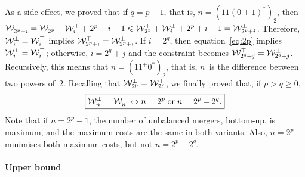 As a side-effect, we proved that if \(q=p-1\), that is,
\(n=(11(0+1)^*)_2\), then \(\mathcal{W}_{2^p+i}^{\top} = \mathcal{W}_{2^p}^{\top} +
\mathcal{W}_{i}^{\top} + 2^p + i - 1 \leqslant \mathcal{W}_{2^p}^{\top} + \mathcal{W}_{i}^{\bot} + 2^p
+ i - 1 = \mathcal{W}_{2^p+i}^{\bot}\). Therefore, \(\mathcal{W}_{i}^{\bot} = \mathcal{W}_{i}^{\top}\)
implies \(\mathcal{W}_{2^p+i}^{\top} = \mathcal{W}_{2^p+i}^{\bot}\). If \(i=2^q\), then
equation~\eqref{eq:2p} implies \(\mathcal{W}_{i}^{\bot} = \mathcal{W}_{i}^{\top}\);
otherwise, \(i = 2^q + j\) and the constraint becomes
\(\mathcal{W}_{2^q+j}^{\top} = \mathcal{W}_{2^q+j}^{\bot}\). Recursively, this means that
\(n=(11^+0^*)_2\), that is, \(n\)~is the difference between two powers
of~\(2\). Recalling that \(\mathcal{W}_{2^p}^{\bot} = \mathcal{W}_{2^p}^{\top}\), we finally
proved that, if \(p > q \geqslant 0\),
\begin{equation}
\boxed{\mathcal{W}_{n}^{\bot} = \mathcal{W}_{n}^{\top} \Leftrightarrow n=2^p \;
  \text{or} \; n=2^p - 2^q.}
\label{eq:Wbms_eq_Wtms}
\end{equation}
Note that if \(n=2^p-1\), the number of unbalanced mergers, bottom-up,
is maximum, and the maximum costs are the same in both variants. Also,
\(n=2^p\) minimises both maximum costs, but not \(n=2^p-2^q\).

\paragraph{Upper bound}

